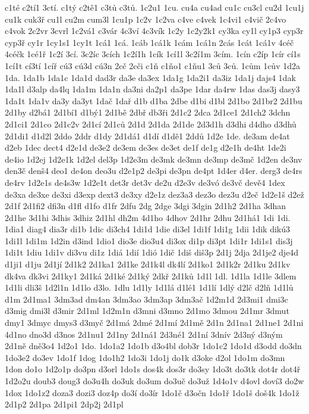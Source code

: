 c1té
c2tí1
3ctí.
c1tý
c2tě1
c3tů
c3tů.
1c2u1
1cu.
cu4a
cu4ad
cu1c
cu3cl
cu2d
1cu1j
cu1k
cuk3ř
cu1l
cu2m
cum3l
1cu1p
1c2v
1c2va
c4ve
c4vek
1c4vi1
c4vič
2c4vo
c4vok
2c2vr
3cvrl
1c2vá1
c3vár
4c3ví
4c3vík
1c2y
1c2y2k1
cy3ka
cy1l
cy1p3
cyp3r
cyp3ř
cy1r
1cy1s1
1cy1t
1cá1
1cá.
1cáb
1cá1k
1cám
1cá1n
2cás
1cát
1cá1v
4céč
4céčk
1cé1ř
1c2í
3cí.
3c2íc
3cích
1c2í1h
1cík
1cí1l
3c2í1m
3cím.
1cín
c2íp
1cír
cí1s
1cí1t
cí3tí
1cíř
cú3
cú3d
cú3n
2cč
2cči
c1ň
c1ňo1
c1ňu1
3ců
3ců.
1cům
1cův
1d2a
1da.
1da1b
1da1c
1da1d
dad3r
da3e
da3ex
1da1g
1da2i1
da3iz
1da1j
dajs4
1dak
1da1l
d3alp
da4lq
1da1m
1da1n
da3ni
da2p1
da3pe
1dar
da4rw
1das
das3j
dasy3
1da1t
1da1v
da3y
da3yt
1dač
1dař
d1b
d1ba
2dbe
d1bi
d1bl
2d1bo
2d1br2
2d1bu
2d1by
d2bá1
2d1bí1
d1bý1
2d1bě
2dbř
db3ři
2d1c2
2dca
2d1ce1
2d1ch2
3dchn
2d1ci1
2d1co
2d1c2v
2d1cí
2d1ců
2d1d
2d1da
2d1de
2d3d1h
d3dhi
d4dho
d3dhů
2d1di1
d1d2l
2ddo
2ddr
d1dy
2d1dá1
d1dí
d1dě1
2ddů
1d2e
1de.
de3am
de4at
d2eb
1dec
dect4
d2e1d
de3e2
de3em
de3es
de3et
de1f
de1g
d2e1h
de4ht
1de2i
de4io
1d2ej
1d2e1k
1d2el
del3p
1d2e3m
de3mk
de3mn
de3mp
de3mč
1d2en
de3nv
den3č
denš4
deo1
de4on
deo3u
d2e1p2
de3pi
de3pn
de4pt
1d4er
d4er.
derg3
de4rs
de4rv
1d2e1s
de4s3w
1d2e1t
det3r
det3v
de2u
d2e3v
de3vó
de3vč
devě4
1dex
de3xa
de3xe
de3xi
d3exp
dext3
de3xy
d2e1z
dez3a3
dez3o
dez3u
d2eč
1d2e1š
d2ež
2d1f
2d1fi2
dfi3n
d1fl
d1fo
d1fr
2dfu
2dg
2dge
3dgi
3dgin
2d1h2
2d1ha
3dhan
2d1he
3d1hi
3dhis
3dhiz
2d1hl
dh2m
4d1ho
4dhov
2d1hr
2dhu
2d1há1
1di
1di.
1dia1
diag4
dia3r
di1b
1dic
di3ch4
1di1d
1die
di3el
1di1f
1di1g
1dii
1dik
dikú3
1di1l
1di1m
1d2in
d3ind
1dio1
dio3e
dio3u4
di3ox
di1p
di3pt
1di1r
1di1s1
dis3j
1di1t
1diu
1di1v
di3vu
di1z
1diá
1dií
1dió
1dič
1diš
diš3p
2d1j
2dja
2d1je2
dje4d
d1ji1
d1ju
2d1jí
2d1k2
2d1ka1
2d1ke
2d1k4l
dk4lí
2d1ko1
2d1k2r
2d1ku
2d1kv
dk4va
dk3vi
2d1ky1
2d1ká
2d1ké
2d1ký
2dkř
2d1ků
1d1l
1dl.
1d1la
1d1le
3dlem
1d1li
dli3š
1d2l1n
1d1lo
d3lo.
1dlu
1d1ly
1d1lá
d1lé1
1d1lí
1dlý
d2lč
d2lň
1d1lů
d1m
2d1ma1
3dm3ad
dm4an
3dm3ao
3dm3ap
3dm3ač
1d2m1d
2d3mi1
dmi3c
d3mig
dmi3l
d3mir
2d1ml
1d2m1n
d3mni
d3mno
2d1mo
3dmou
2d1mr
3dmut
dmy1
3dmyc
dmys3
d3myč
2d1má
2dmé
2d1mí
2d1mě
2d1n
2d1na1
2d1ne1
2d1ni
4d1no
dno3d
d3nos
2d1nu1
2d1ny
2d1ná1
2d3né1
2d1ní
3dnív
2d3ný
d3ným
2d1ně
dně3o4
1d2o1
1do.
1do1a2
1do1b
d3o4bl
dob3r
1do1c2
1do1d
d3odd
do3dn
1do3e2
do3ev
1do1f
1dog
1do1h2
1do3i
1do1j
do1k
d3oke
d2ol
1do1m
do3mn
1don
do1o
1d2o1p
do3pn
d3orl
1do1s
dos4k
dos3r
do3sy
1do3t
do3tk
dot4r
dot4ř
1d2o2u
doub3
doug3
do3u4h
do3uk
do3um
do3uč
do3už
1d4o1v
d4ovl
doví3
do2w
1dox
1do1z2
doza3
dozi3
doz4p
do3í
do3ír
1do1č
d3očn
1do1ř
1do1š
doš4k
1do1ž
2d1p2
2d1pa
2d1pi1
2dp2j
2d1pl

